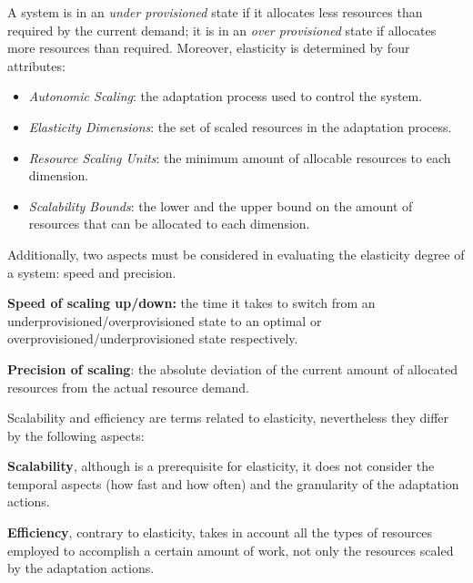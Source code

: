 A system is in an \textit{under provisioned} state if it allocates less resources than required by the current demand; it is in an \textit{over provisioned} state if allocates more resources than required. Moreover, elasticity is determined by four attributes:

\begin{itemize}
	\item \textit{Autonomic Scaling}: the adaptation process used to control the system.
	\item \textit{Elasticity Dimensions}: the set of scaled resources in the adaptation process.
	\item \textit{Resource Scaling Units}: the minimum amount of allocable resources to each dimension.
	\item \textit{Scalability Bounds}: the lower and the upper bound on the amount of resources that can be allocated to each dimension.
\end{itemize}

Additionally, two aspects must be considered in evaluating the elasticity degree of a system: speed and precision. 

\textbf{Speed of scaling up/down:} the time it takes to switch from an underprovisioned/overprovisioned state to an optimal or overprovisioned/underprovisioned state respectively. 

\textbf{Precision of scaling}: the absolute deviation of the current amount of allocated resources from the actual resource demand.

Scalability and efficiency are terms related to elasticity, nevertheless they differ by the following aspects:
 
\textbf{Scalability}, although is a prerequisite for elasticity, it does not consider the temporal aspects (how fast and how often) and the granularity of the adaptation actions.

\textbf{Efficiency}, contrary to elasticity, takes in account all the types of resources employed to accomplish a certain amount of work, not only the resources scaled by the adaptation actions. 

